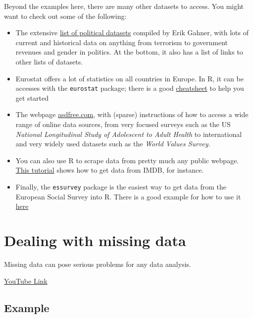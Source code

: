 \documentclass[
]{book}
\providecommand{\tightlist}{%
  \setlength{\itemsep}{0pt}\setlength{\parskip}{0pt}}
\begin{document}
Beyond the examples here, there are many other datasets to access. You might want to check out some of the following:

\begin{itemize}
\tightlist
\item
  The extensive \href{https://github.com/erikgahner/PolData}{list of political datasets} compiled by Erik Gahner, with lots of current and historical data on anything from terrorism to government revenues and gender in politics. At the bottom, it also has a list of links to other lists of datasets.
\item
  Eurostat offers a lot of statistics on all countries in Europe. In R, it can be accesses with the \texttt{eurostat} package; there is a good \href{https://github.com/rstudio/cheatsheets/raw/master/eurostat.pdf}{cheatsheet} to help you get started
\item
  The webpage \href{http://asdfree.com/}{asdfree.com}, with (sparse) instructions of how to access a wide range of online data sources, from very focused surveys such as the US \emph{National Longitudinal Study of Adolescent to Adult Health} to international and very widely used datasets such as the \emph{World Values Survey.}
\item
  You can also use R to scrape data from pretty much any public webpage. \href{https://www.analyticsvidhya.com/blog/2017/03/beginners-guide-on-web-scraping-in-r-using-rvest-with-hands-on-knowledge/}{This tutorial} shows how to get data from IMDB, for instance.
\item
  Finally, the \texttt{essurvey} package is the easiest way to get data from the European Social Survey into R. There is a good example for how to use it \href{https://ropensci.org/blog/2018/06/14/essurvey/}{here}
\end{itemize}

\hypertarget{dealing-with-missing-data}{%
\chapter{Dealing with missing data}\label{dealing-with-missing-data}}

Missing data can pose serious problems for any data analysis.

\textcolor{blue}{\href{https://www.youtube.com/embed/FT6oYGyWTGY?rel=0&modestbranding=1&loop=1&playlist=sk7TT5qM5Hw}{YouTube Link}}

\hypertarget{example}{%
\section{Example}\label{example}}
\end{document}
